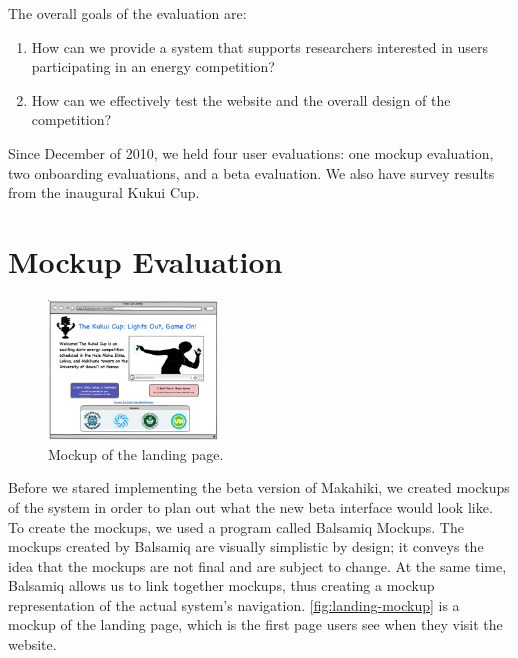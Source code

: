 \noindent The overall goals of the evaluation are:

\begin{enumerate}
  \item How can we provide a system that supports researchers interested in users participating in an energy competition?
	\item How can we effectively test the website and the overall design of the competition?
\end{enumerate}


Since December of 2010, we held four user evaluations: one mockup evaluation, two onboarding evaluations, and a beta evaluation. We also have survey results from the inaugural Kukui Cup.

\section{Mockup Evaluation}
\label{eval-mockup}

\begin{figure}[h]
  \center
  \includegraphics[width=0.4\textwidth]{images/landing-mockup.eps}
  \caption{Mockup of the landing page.}
  \label{fig:landing-mockup}
\end{figure}

Before we stared implementing the beta version of Makahiki, we created mockups of the system in order to plan out what the new beta interface would look like. To create the mockups, we used a program called Balsamiq Mockups\cite{balsamiq-mockup}.  The mockups created by Balsamiq are visually simplistic by design; it conveys the idea that the mockups are not final and are subject to change.  At the same time, Balsamiq allows us to link together mockups, thus creating a mockup representation of the actual system's navigation. \autoref{fig:landing-mockup} is a mockup of the landing page, which is the first page users see when they visit the website.

